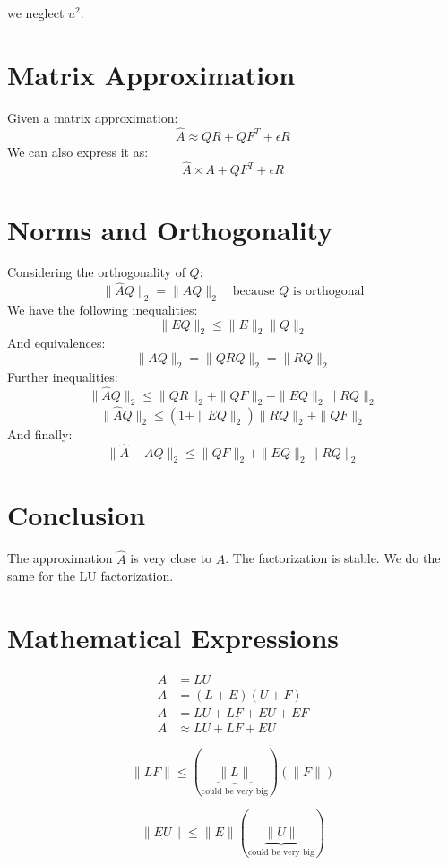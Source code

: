 we neglect $u^2$.

\section*{Matrix Approximation}

Given a matrix approximation:
\[
\hat{A} \approx QR + QF^T + \epsilon R
\]
We can also express it as:
\[
\hat{A} \times A + QF^T + \epsilon R
\]

\section*{Norms and Orthogonality}

Considering the orthogonality of $Q$:
\[
\|\hat{A}Q\|_2 = \|AQ\|_2 \quad \text{because $Q$ is orthogonal}
\]
We have the following inequalities:
\[
\|EQ\|_2 \leq \|E\|_2\|Q\|_2
\]
And equivalences:
\[
\|AQ\|_2 = \|QRQ\|_2 = \|RQ\|_2
\]
Further inequalities:
\[
\|\hat{A}Q\|_2 \leq \|QR\|_2 + \|QF\|_2 + \|EQ\|_2\|RQ\|_2
\]
\[
\|\hat{A}Q\|_2 \leq (1 + \|EQ\|_2)\|RQ\|_2 + \|QF\|_2
\]
And finally:
\[
\|\hat{A} - AQ\|_2 \leq \|QF\|_2 + \|EQ\|_2\|RQ\|_2
\]

\section*{Conclusion}

The approximation $\hat{A}$ is very close to $A$. The factorization is stable. We do the same for the LU factorization.

\section*{Mathematical Expressions}

\begin{align*}
A &= LU \\
A &= (L + E)(U + F) \\
A &= LU + LF + EU + EF \\
A &\approx LU + LF + EU
\end{align*}

\begin{mdframed}[backgroundcolor=blue!20]
\[\|LF\| \leq (\underbrace{\|L\|}_{\text{could be very big}}) (\|F\|)\]
\end{mdframed}

\begin{mdframed}[backgroundcolor=blue!20]
\[\|EU\| \leq \|E\|(\underbrace{\|U\|}_{\text{could be very big}})\]
\end{mdframed}


